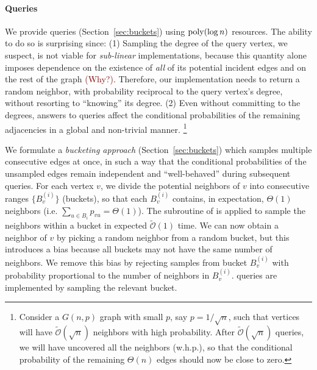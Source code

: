 \paragraph*{ Queries}
\label{par:random_neighbor_queries}

We provide  queries (Section~\ref{sec:buckets}) using $\mathrm{poly}(\log n)$ resources.
The ability to do so is surprising since:
(1) Sampling the degree of the query vertex, we suspect, is not viable for \emph{sub-linear} implementations, because this quantity alone
imposes dependence on the existence of \emph{all} of its potential incident edges and on the rest of the graph \textcolor{Maroon}{(Why?)}.
Therefore, our implementation needs to return a random neighbor, with probability reciprocal to the query vertex's degree,
without resorting to ``knowing'' its degree.
(2) Even without committing to the degrees, answers to  queries
affect the conditional probabilities of the remaining adjacencies in a global and non-trivial manner.
\footnote{\label{conditional}Consider a $G(n,p)$ graph with small $p$, say $p = 1/\sqrt n$,
such that vertices will have $\tilde{\mathcal{O}}(\sqrt n)$ neighbors with high probability.
After $\tilde{\mathcal{O}}(\sqrt n)$  queries, we will have uncovered all the neighbors (w.h.p.),
so that the conditional probability of the remaining $\Theta(n)$ edges should now be close to zero.}

We formulate a \emph{bucketing approach} (Section~\ref{sec:buckets}) which samples multiple consecutive edges at once,
in such a way that the conditional probabilities of the unsampled edges remain independent and ``well-behaved'' during subsequent queries.
For each vertex $v$, we divide the potential neighbors of $v$ into consecutive ranges $\{B^{(i)}_v\}$ (buckets),
so that each $B^{(i)}_v$ contains, in expectation, $\Theta(1)$ neighbors (i.e. $\sum_{u\in B_i} p_{vu} = \Theta(1)$).
The subroutine of  is applied to sample the neighbors within a bucket in expected $\mathcal{\tilde O}(1)$ time.
We can now obtain a neighbor of $v$ by picking a random neighbor from a random bucket,
but this introduces a bias because all buckets may not have the same number of neighbors.
We remove this bias by rejecting samples from bucket $B^{(i)}_v$ with probability proportional to the number of neighbors in $B^{(i)}_v$.
 queries are implemented by sampling the relevant bucket.




